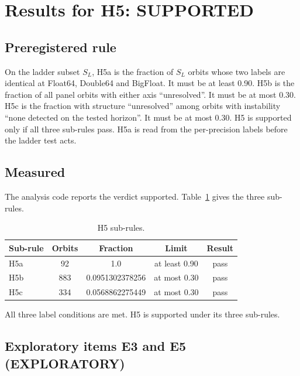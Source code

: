 \documentclass[aip,cha,reprint,amsmath,amssymb,longbibliography]{revtex4-2}
\begin{document}
\section{Results for H5: SUPPORTED}
\label{sec:h5}

\subsection{Preregistered rule}

On the ladder subset $S_L$, H5a is the fraction of $S_L$ orbits whose two labels are identical at Float64, Double64 and BigFloat.
It must be at least 0.90.
H5b is the fraction of all panel orbits with either axis ``unresolved''.
It must be at most 0.30.
H5c is the fraction with structure ``unresolved'' among orbits with instability ``none detected on the tested horizon''.
It must be at most 0.30.
H5 is supported only if all three sub-rules pass.
H5a is read from the per-precision labels before the ladder test acts.

\subsection{Measured}

The analysis code reports the verdict supported.
Table~\ref{tab:h5} gives the three sub-rules.

\begin{table}
\caption{H5 sub-rules.}
\label{tab:h5}
\begin{ruledtabular}
\begin{tabular}{lcccc}
Sub-rule & Orbits & Fraction & Limit & Result \\
\hline
H5a & 92 & 1.0 & at least 0.90 & pass \\
H5b & 883 & 0.0951302378256 & at most 0.30 & pass \\
H5c & 334 & 0.0568862275449 & at most 0.30 & pass \\
\end{tabular}
\end{ruledtabular}
\end{table}

All three label conditions are met.
H5 is supported under its three sub-rules.

\subsection{Exploratory items E3 and E5 (EXPLORATORY)}
\label{sub:h5exp}
\end{document}
